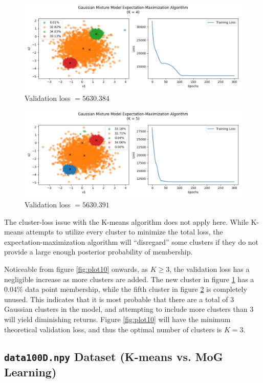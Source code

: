 \documentclass[letterpaper]{article}
\begin{document}
\begin{figure}[H]
	\centering
	\includegraphics[width=\linewidth]{Figure_11}
	\caption{Validation loss $ = 5630.384$}
	\label{fig:plot11}
\end{figure}

\begin{figure}[H]
	\centering
	\includegraphics[width=\linewidth]{Figure_12}
	\caption{Validation loss $ = 5630.391$}
	\label{fig:plot12}
\end{figure}

The cluster-loss issue with the K-means algorithm does not apply here. While K-means attempts to utilize every cluster to minimize the total loss, the expectation-maximization algorithm will ``disregard'' some clusters if they do not provide a large enough posterior probability of membership. 

Noticeable from figure \ref{fig:plot10} onwards, as $K \ge 3$, the validation loss has a negligible increase as more clusters are added. The new cluster in figure \ref{fig:plot11} has a $0.04\%$ data point membership, while the fifth cluster in figure \ref{fig:plot12} is completely unused. This indicates that it is most probable that there are a total of $3$ Gaussian clusters in the model, and attempting to include more clusters than $3$ will yield diminishing returns. Figure \ref{fig:plot10} will have the minimum theoretical validation loss, and thus the optimal number of clusters is $K = 3$.

\subsection{\texttt{data100D.npy} Dataset (K-means vs. MoG Learning)}
\end{document}
